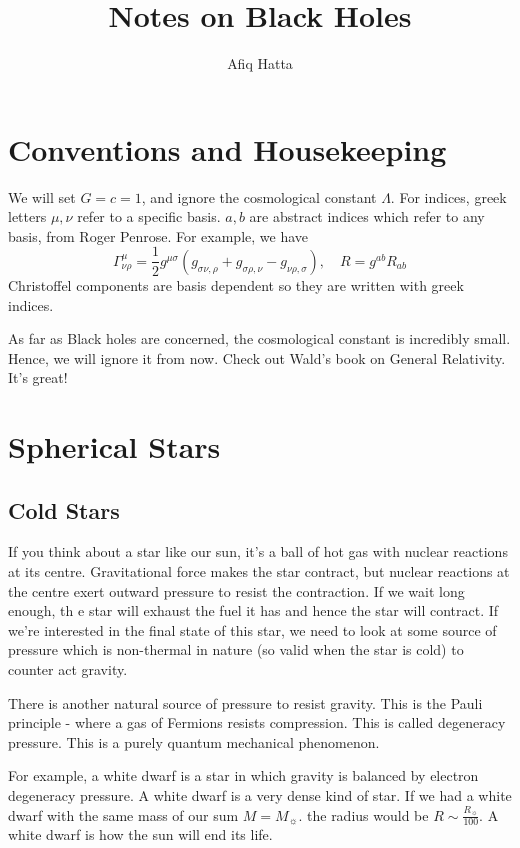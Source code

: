 \documentclass[11pt, oneside]{article}   	%
\title{Notes on Black Holes}
\author{Afiq Hatta }
\theoremstyle{slanted}
\begin{document}
 
\maketitle
\tableofcontents

\section*{Conventions and Housekeeping}
We will set $ G  = c = 1 $, 
and ignore the cosmological constant $ \Lambda $. 
For indices, greek letters $ \mu , \nu $ refer to 
a specific basis. 
$ a, b$ are abstract indices which refer to any basis, 
from Roger Penrose. 
For example, we have 
\[
 \Gamma^ \mu _{ \nu \rho }  = \frac{1}{2 }g ^{ \mu \sigma } 
 \left( g _{ \sigma \nu , \rho } + g _{ \sigma \rho , \nu }  - g _{ \nu \rho , \sigma }  \right), 
 \quad R  = g ^{ ab } R _{ ab } 
\] Christoffel components are 
basis dependent so they are written with greek indices. 


As far as Black holes are concerned, 
the cosmological constant is incredibly small. 
Hence, we will ignore it from now. 
Check out Wald's book on General Relativity. It's great!

\section{Spherical Stars}
\subsection{Cold Stars}
If you think about a star like our sun, 
it's a ball of hot gas with nuclear reactions at its centre. 
Gravitational force makes the star contract, 
but nuclear reactions at the centre exert outward pressure 
to resist the contraction. 
If we wait long enough, th e star will exhaust the fuel 
it has and hence the star will contract. 
If we're interested in the final state of this star, 
we need to look at some source of pressure which is non-thermal in nature 
(so valid when the star is cold) to counter act gravity. 

There is another natural source of pressure to resist gravity. 
This is the Pauli principle - where a gas of Fermions 
resists compression. This is called degeneracy pressure. 
This is a purely quantum mechanical phenomenon. 

For example, a white dwarf is a star in which gravity is balanced 
by electron degeneracy pressure. 
A white dwarf is a very dense kind of star. If we 
had a white dwarf with the same mass of our sum $ M  = M _{ \sun } $. 
the radius would be $ R \sim \frac{R_{\sun } }{100 } $. 
A white dwarf is how the sun will end its life. 
 
\end{document}
